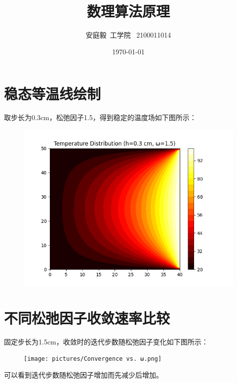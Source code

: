 \documentclass[12pt, a4paper]{article}
\title{数理算法原理}
\author{安庭毅\ 工学院 \ 2100011014}
\date{\today} %
\begin{document}
\maketitle %
\section{稳态等温线绘制}
取步长为0.3cm，松弛因子1.5，得到稳定的温度场如下图所示：
\begin{figure}[htbp]
    \centering
    \includegraphics[width=\textwidth]{pictures/Temperature Distribution.png}
\end{figure}
\section{不同松弛因子收敛速率比较}
固定步长为1.5cm，收敛时的迭代步数随松弛因子变化如下图所示：
\begin{figure}[htbp]
    \centering
    \texttt{[image: pictures/Convergence vs. ω.png]}
\end{figure}
可以看到迭代步数随松弛因子增加而先减少后增加。
\end{document}

